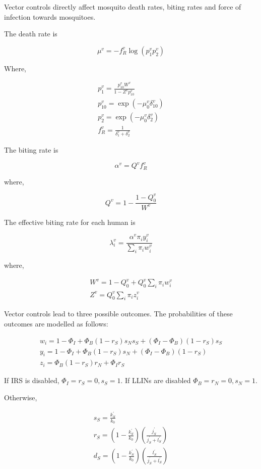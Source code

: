 \documentclass{bmcart}
\begin{document}
Vector controls directly affect mosquito death rates, biting rates and force of infection towards mosquitoes.

The death rate is

\[
\mu^v = -f_R^v \log(p_1^vp_2^v)
\]

Where,

\begin{gather*}
p_1^v = \frac{p_{10}^vW^v}{1 - Z^vp^v_{10}} \\
p_{10}^v = \exp(-\mu_0^v\delta^v_{10}) \\
p_2^v = \exp(-\mu_0^v\delta^v_2) \\
f_R^v = \frac{1}{\delta^v_1 + \delta^v_2}
\end{gather*}

The biting rate is

\[
\alpha^v = Q^v f^v_R
\]

where,

\[
Q^v = 1 - \frac{1 - Q_0^v}{W^v}
\]

The effective biting rate for each human is

\[
\lambda^v_i = \frac{\alpha^v\pi_iy^v_i}{\sum_i \pi_i w^v_i}
\]

where,

\begin{gather*}
    W^v = 1 - Q_0^v + Q_0^v \sum_i \pi_iw_i^v\\
    Z^v = Q_0^v \sum_i \pi_iz_i^v
\end{gather*}

Vector controls lead to three possible outcomes. The probabilities of these outcomes are modelled as follows:

\begin{gather*}
    w_i = 1 - \Phi_I + \Phi_B(1 -  r_S)s_Ns_S + (\Phi_I - \Phi_B)(1 - r_S)s_S\\
    y_i = 1 - \Phi_I + \Phi_B(1 -  r_S)s_N + (\Phi_I - \Phi_B)(1 - r_S)\\
    z_i = \Phi_B(1 - r_S)r_N + \Phi_Ir_S
\end{gather*}

If IRS is disabled, $\Phi_I = r_S = 0, s_S = 1$. If LLINs are disabled $\Phi_B = r_N = 0, s_N = 1$.

Otherwise,

\begin{gather*}
    s_S = \frac{k^\prime_S}{k_0} \\
    r_S = \left(1 - \frac{k^\prime_S}{k_0}\right)\left(\frac{j^\prime_S}{j^\prime_S + l^\prime_S}\right) \\
    d_S = \left(1 - \frac{k^\prime_S}{k_0}\right)\left(\frac{l^\prime_S}{j^\prime_S + l^\prime_S}\right)
\end{gather*}
\end{document}
